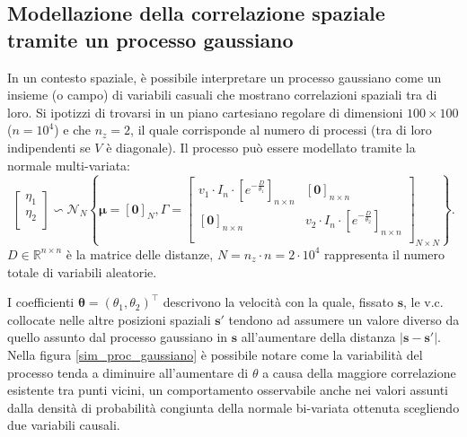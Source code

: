 \subsection[Modellazione della correlazione spaziale tramite un processo gaussiano]{Modellazione della correlazione spaziale tramite un processo gaussiano}
In un contesto spaziale, è possibile interpretare un processo gaussiano come un insieme (o campo) di variabili casuali che mostrano correlazioni spaziali tra di loro. Si ipotizzi di trovarsi in un piano cartesiano regolare di dimensioni $100\times100$ ($n=10^4$) e che $n_z =2$, il quale corrisponde al numero di processi (tra di loro indipendenti se $V$ è diagonale). Il processo può essere modellato tramite la normale multi-variata:
\[
	\begin{bmatrix}
		\eta_1 \\
		\eta_2 \\
	\end{bmatrix}\backsim \mathcal{N}_N\left\{\boldsymbol{\mu}=[\mathbf{0}]_{N}, \Gamma = 
	\begin{bmatrix}
		v_1\cdot I_{n}\cdot [e^{-\frac{D}{\theta_1}}]_{n\times n} & [\mathbf{0}]_{n\times n} \\
		[\mathbf{0}]_{n\times n} & v_2\cdot I_{n}\cdot [e^{-\frac{D}{\theta_2}}]_{n\times n} \\
	\end{bmatrix}_{N\times N}
	\right\}.
\]
$D\in\mathbb{R}^{n\times n}$ è la matrice delle distanze, $N=n_z\cdot n = 2\cdot 10^4$ rappresenta il numero totale di variabili aleatorie.
\par I coefficienti $\boldsymbol{\theta} = (\theta_1,\theta_2)^\top$ descrivono la velocità con la quale, fissato $\mathbf{s}$, le v.c. collocate nelle altre posizioni spaziali $\mathbf{s}'$ tendono ad assumere un valore diverso da quello assunto dal processo gaussiano in $\mathbf{s}$ all'aumentare della distanza $|\mathbf{s} - \mathbf{s}'|$. Nella figura \ref{sim_proc_gaussiano} è possibile notare come la variabilità del processo tenda a diminuire all'aumentare di $\theta$ a causa della maggiore correlazione esistente tra punti vicini, un comportamento osservabile anche nei valori assunti dalla densità di probabilità congiunta della normale bi-variata ottenuta scegliendo due variabili causali.

